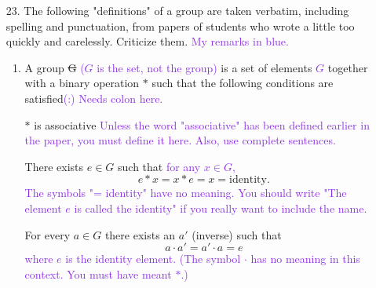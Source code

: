 \documentclass[letterpaper]{article}
\begin{document}
\begin{enumerate}
\item[23.] The following "definitions" of a group are taken verbatim, including spelling and punctuation, from papers of students who wrote a little too quickly and carelessly. Criticize them. \textcolor{BlueViolet}{My remarks in blue.}
	\begin{enumerate}[label=\alph*.]
	\item A group \sout{G} \textcolor{BlueViolet}{($G$ is the set, not the group)} is a set of elements \textcolor{BlueViolet}{$G$} together with a binary operation $*$ such that the following conditions are satisfied\textcolor{BlueViolet}{(:) Needs colon here. }
	
	$*$ is associative \textcolor{BlueViolet}{Unless the word "associative" has been defined earlier in the paper, you must define it here. Also, use complete sentences.}
	
	There exists $e\in G$ such that \textcolor{BlueViolet}{for any $x\in G$,}
	$$e*x=x*e=x= \text{identity.}$$
	\textcolor{BlueViolet}{The symbols "= identity" have no meaning. You should write "The element $e$ is called the identity" if you really want to include the name.}
	
	For every $a\in G$ there exists an $a'$ (inverse) such that 
	$$a\cdot a' = a'\cdot a= e$$
	\textcolor{BlueViolet}{where $e$ is the identity element. (The symbol $\cdot$ has no meaning in this context. You must have meant $*$.)}
	\end{enumerate}


\end{enumerate}
\end{document}
